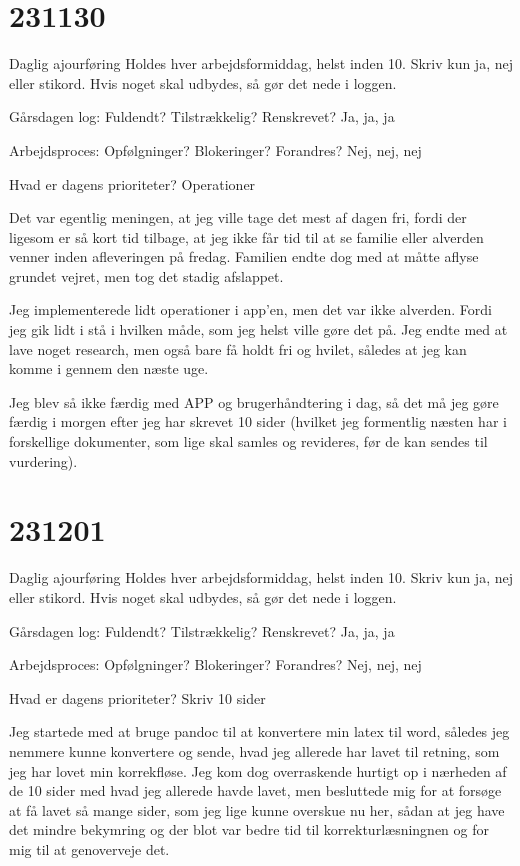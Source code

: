 \documentclass{report}
\begin{document}
\section{231130}
Daglig ajourføring
Holdes hver arbejdsformiddag, helst inden 10. Skriv kun ja, nej eller stikord. Hvis noget skal udbydes, så gør det nede i loggen.
 
Gårsdagen log: Fuldendt? Tilstrækkelig? Renskrevet?
 Ja, ja, ja
 
Arbejdsproces: Opfølgninger? Blokeringer? Forandres?
Nej, nej, nej
 
Hvad er dagens prioriteter?
Operationer
 
Det var egentlig meningen, at jeg ville tage det mest af dagen fri, fordi der ligesom er så kort tid tilbage, at jeg ikke får tid til at se familie eller alverden venner inden afleveringen på fredag.
Familien endte dog med at måtte aflyse grundet vejret, men tog det stadig afslappet.
 
Jeg implementerede lidt operationer i app'en, men det var ikke alverden. Fordi jeg gik lidt i stå i hvilken måde, som jeg helst ville gøre det på. Jeg endte med at lave noget research, men også bare få holdt fri og hvilet, således at jeg kan komme i gennem den næste uge.
 
Jeg blev så ikke færdig med APP og brugerhåndtering i dag, så det må jeg gøre færdig i morgen efter jeg har skrevet 10 sider (hvilket jeg formentlig næsten har i forskellige dokumenter, som lige skal samles og revideres, før de kan sendes til vurdering).

\section{231201}
Daglig ajourføring
Holdes hver arbejdsformiddag, helst inden 10. Skriv kun ja, nej eller stikord. Hvis noget skal udbydes, så gør det nede i loggen.
 
Gårsdagen log: Fuldendt? Tilstrækkelig? Renskrevet?
 Ja, ja, ja
 
Arbejdsproces: Opfølgninger? Blokeringer? Forandres?
Nej, nej, nej
 
Hvad er dagens prioriteter?
Skriv 10 sider
 
Jeg startede med at bruge pandoc til at konvertere min latex til word, således jeg nemmere kunne konvertere og sende, hvad jeg allerede har lavet til retning, som jeg har lovet min korrekfløse.
Jeg kom dog overraskende hurtigt op i nærheden af de 10 sider med hvad jeg allerede havde lavet, men besluttede mig for at forsøge at få lavet så mange sider, som jeg lige kunne overskue nu her, sådan at jeg have det mindre bekymring og der blot var bedre tid til korrekturlæsningnen og for mig til at genoverveje det.
 
\end{document}
